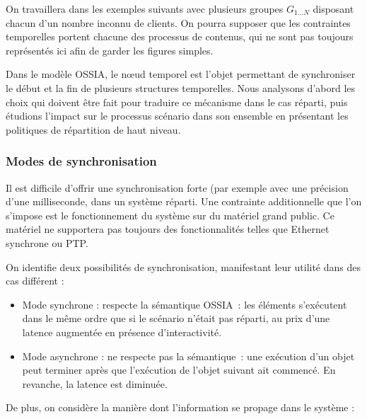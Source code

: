 \documentclass{article}
\newcommand\ossia{OSSIA\xspace}
\begin{document}
On travaillera dans les exemples suivants avec plusieurs groupes $G_{1\dots N}$ disposant chacun d'un nombre inconnu de clients. 
On pourra supposer que les contraintes temporelles portent chacune des processus de contenus, qui ne sont pas toujours représentés ici afin de garder les figures simples.

Dans le modèle \ossia, le nœud temporel est l'objet permettant de synchroniser le début et la fin de plusieurs structures temporelles. 
Nous analysons d'abord les choix qui doivent être fait pour traduire ce mécanisme dans le cas réparti, puis étudions l'impact sur le processus scénario dans son ensemble en présentant les politiques de répartition de haut niveau.
\subsubsection{Modes de synchronisation}
Il est difficile d'offrir une synchronisation forte (par exemple avec une précision d'une milliseconde, dans un système réparti\cite{sheehy2015there}. 
Une contrainte additionnelle que l'on s'impose est le fonctionnement du système sur du matériel grand public. 
Ce matériel ne supportera pas toujours des fonctionnalités telles que Ethernet synchrone\cite{ferrant2008synchronous} ou PTP.


On identifie deux possibilités de synchronisation, manifestant leur utilité dans des cas différent : 
\begin{itemize}
	\item Mode synchrone : respecte la sémantique \ossia{}~: les éléments s'exécutent dans le même ordre que si le scénario n'était pas réparti, au prix d'une latence augmentée en présence d'interactivité.
	\item Mode asynchrone : ne respecte pas la sémantique~: une exécution d'un objet peut terminer après que l'exécution de l'objet suivant ait commencé. En revanche, la latence est diminuée.    
\end{itemize}

De plus, on considère la manière dont l'information se propage dans le système :
\end{document}

